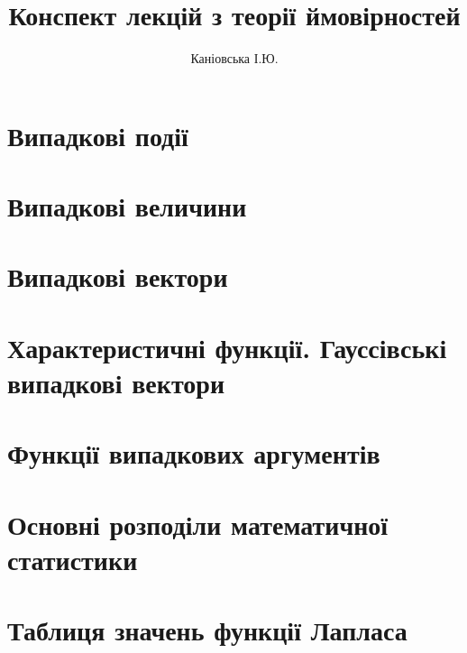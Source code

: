 \documentclass{report}
\author{Каніовська І.Ю.}
\title{Конспект лекцій з теорії ймовірностей}
\date{}
\begin{document}
 
    \maketitle
    \tableofcontents
    \chapter{Випадкові події}
        
        
        
        
    \chapter{Випадкові величини}
        
        
        
    \chapter{Випадкові вектори}
        
        
        
        
    \chapter{Характеристичні функції. Гауссівські випадкові вектори}
         
        
    \chapter{Функції випадкових аргументів}
        
        
    \chapter{Основні розподіли математичної статистики}
        
    \chapter*{Таблиця значень функції Лапласа}
        
\end{document}
